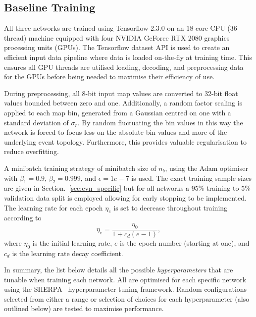 \subsection{Baseline Training} %
\label{sec:cvn_baseline_training} %

All three networks are trained using Tensorflow 2.3.0 on an 18 core CPU (36 thread) machine
equipped with four NVIDIA GeForce RTX 2080 graphics processing units (GPUs). The Tensorflow
dataset API is used to create an efficient input data pipeline where data is loaded on-the-fly at
training time. This ensures all GPU threads are utilised loading, decoding, and preprocessing data
for the GPUs before being needed to maximise their efficiency of use.

During preprocessing, all 8-bit input map values are converted to 32-bit float values bounded
between zero and one. Additionally, a random factor scaling is applied to each map bin, generated
from a Gaussian centred on one with a standard deviation of $\sigma_{r}$. By random fluctuating
the bin values in this way the network is forced to focus less on the absolute bin values and more
of the underlying event topology. Furthermore, this provides valuable regularisation to reduce
overfitting.

A minibatch training strategy of minibatch size of $n_{b}$, using the Adam
optimiser~\cite{kingma2014} with $\beta_{1}=0.9$, $\beta_{2}=0.999$, and $\epsilon = 1e-7$ is
used. The exact training sample sizes are given in Section.~\ref{sec:cvn_specific} but for all
networks a 95\% training to 5\% validation data split is employed allowing for early stopping to
be implemented. The learning rate for each epoch $\eta_{e}$ is set to decrease throughout training
according to
\begin{equation}
    \eta_{e}=\frac{\eta_{0}}{1+c_{d}(e-1)},
\end{equation}
where $\eta_{0}$ is the initial learning rate, $e$ is the epoch number (starting at one), and
$c_{d}$ is the learning rate decay coefficient.

In summary, the list below details all the possible \emph{hyperparameters} that are tunable when
training each network. All are optimised for each specific network using the
SHERPA~\cite{hertel2020} hyperparameter tuning framework. Random configurations selected from
either a range or selection of choices for each hyperparameter (also outlined below) are tested to
maximise performance.

